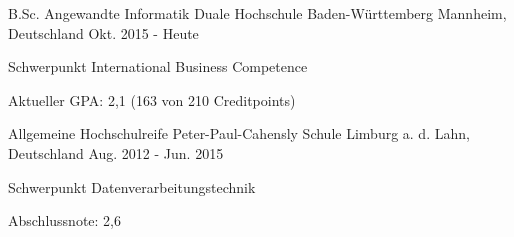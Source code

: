 

\begin{cventries}

  \cventry
    {B.Sc. Angewandte Informatik} %
    {Duale Hochschule Baden-Württemberg} %
    {Mannheim, Deutschland} %
    {Okt. 2015 - Heute} %
    {
      \begin{cvitems} %
        \item {Schwerpunkt International Business Competence}
        \item {Aktueller GPA: 2,1 (163 von 210 Creditpoints)}
      \end{cvitems}
    }
    
  \cventry
    {Allgemeine Hochschulreife} %
    {Peter-Paul-Cahensly Schule} %
    {Limburg a. d. Lahn, Deutschland} %
    {Aug. 2012 - Jun. 2015} %
    {
      \begin{cvitems} %
        \item {Schwerpunkt Datenverarbeitungstechnik}
        \item {Abschlussnote: 2,6}
      \end{cvitems}
    }
    

\end{cventries}
